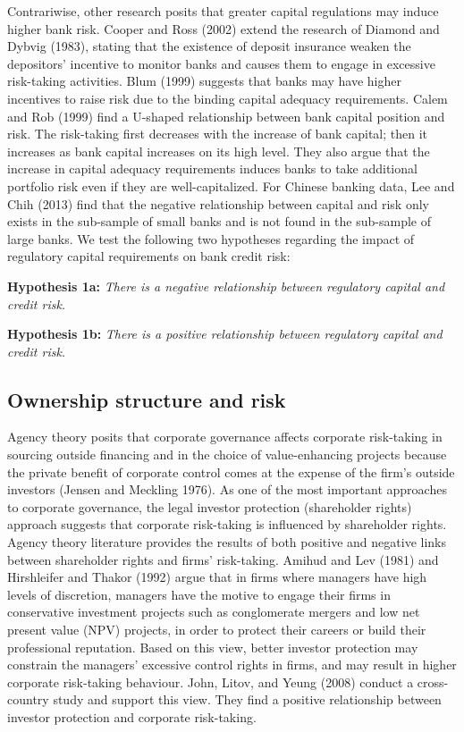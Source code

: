 \documentclass{article}
\begin{document}
Contrariwise, other research posits that greater capital regulations may
induce higher bank risk. Cooper and Ross (2002) extend the research of
Diamond and Dybvig (1983), stating that the existence of deposit
insurance weaken the depositors' incentive to monitor banks and causes
them to engage in excessive risk-taking activities. Blum (1999) suggests
that banks may have higher incentives to raise risk due to the binding
capital adequacy requirements. Calem and Rob (1999) find a U-shaped
relationship between bank capital position and risk. The risk-taking
first decreases with the increase of bank capital; then it increases as
bank capital increases on its high level. They also argue that the
increase in capital adequacy requirements induces banks to take
additional portfolio risk even if they are well-capitalized. For Chinese
banking data, Lee and Chih (2013) find that the negative relationship
between capital and risk only exists in the sub-sample of small banks
and is not found in the sub-sample of large banks. We test the following
two hypotheses regarding the impact of regulatory capital requirements
on bank credit risk:

\textbf{Hypothesis 1a:} \emph{There is a negative relationship between
regulatory capital and credit risk.}

\textbf{Hypothesis 1b:} \emph{There is a positive relationship between
regulatory capital and credit risk.}

\hypertarget{ownership-structure-and-risk}{%
\subsection{Ownership structure and
risk}\label{ownership-structure-and-risk}}

Agency theory posits that corporate governance affects corporate
risk-taking in sourcing outside financing and in the choice of
value-enhancing projects because the private benefit of corporate
control comes at the expense of the firm's outside investors (Jensen and
Meckling 1976). As one of the most important approaches to corporate
governance, the legal investor protection (shareholder rights) approach
suggests that corporate risk-taking is influenced by shareholder rights.
Agency theory literature provides the results of both positive and
negative links between shareholder rights and firms' risk-taking. Amihud
and Lev (1981) and Hirshleifer and Thakor (1992) argue that in firms
where managers have high levels of discretion, managers have the motive
to engage their firms in conservative investment projects such as
conglomerate mergers and low net present value (NPV) projects, in order
to protect their careers or build their professional reputation. Based
on this view, better investor protection may constrain the managers'
excessive control rights in firms, and may result in higher corporate
risk-taking behaviour. John, Litov, and Yeung (2008) conduct a
cross-country study and support this view. They find a positive
relationship between investor protection and corporate risk-taking.
\end{document}
